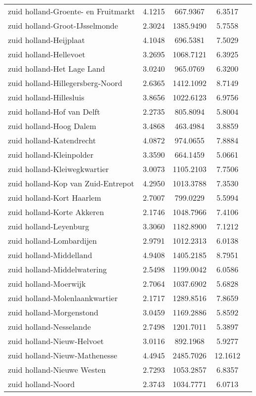 \begin{longtable}{llccc}
zuid holland-Groente- en Fruitmarkt & 4.1215 & 667.9367 & 6.3517 \\
zuid holland-Groot-IJsselmonde & 2.3024 & 1385.9490 & 5.7558 \\
zuid holland-Heijplaat & 4.1048 & 696.5381 & 7.5029 \\
zuid holland-Hellevoet & 3.2695 & 1068.7121 & 6.3925 \\
zuid holland-Het Lage Land & 3.0240 & 965.0769 & 6.3200 \\
zuid holland-Hillegersberg-Noord & 2.6365 & 1412.1092 & 8.7149 \\
zuid holland-Hillesluis & 3.8656 & 1022.6123 & 6.9756 \\
zuid holland-Hof van Delft & 2.2735 & 805.8094 & 5.8004 \\
zuid holland-Hoog Dalem & 3.4868 & 463.4984 & 3.8859 \\
zuid holland-Katendrecht & 4.0872 & 974.0655 & 7.8884 \\
zuid holland-Kleinpolder & 3.3590 & 664.1459 & 5.0661 \\
zuid holland-Kleiwegkwartier & 3.0073 & 1105.2103 & 7.7506 \\
zuid holland-Kop van Zuid-Entrepot & 4.2950 & 1013.3788 & 7.3530 \\
zuid holland-Kort Haarlem & 2.7007 & 799.0229 & 5.5994 \\
zuid holland-Korte Akkeren & 2.1746 & 1048.7966 & 7.4106 \\
zuid holland-Leyenburg & 3.3060 & 1182.8900 & 7.1212 \\
zuid holland-Lombardijen & 2.9791 & 1012.2313 & 6.0138 \\
zuid holland-Middelland & 4.9408 & 1405.2185 & 8.7951 \\
zuid holland-Middelwatering & 2.5498 & 1199.0042 & 6.0586 \\
zuid holland-Moerwijk & 2.7064 & 1037.6902 & 5.6828 \\
zuid holland-Molenlaankwartier & 2.1717 & 1289.8516 & 7.8659 \\
zuid holland-Morgenstond & 3.0459 & 1169.2886 & 5.8592 \\
zuid holland-Nesselande & 2.7498 & 1201.7011 & 5.3897 \\
zuid holland-Nieuw-Helvoet & 3.0116 & 892.1968 & 5.9277 \\
zuid holland-Nieuw-Mathenesse & 4.4945 & 2485.7026 & 12.1612 \\
zuid holland-Nieuwe Westen & 2.7293 & 1053.2857 & 6.8357 \\
zuid holland-Noord & 2.3743 & 1034.7771 & 6.0713 \\

\end{longtable}
